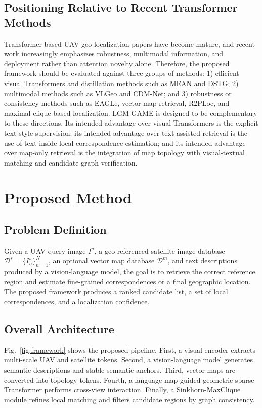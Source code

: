 \documentclass[journal]{IEEEtran}
\begin{document}
\subsection{Positioning Relative to Recent Transformer Methods}
Transformer-based UAV geo-localization papers have become mature, and recent work increasingly emphasizes robustness, multimodal information, and deployment rather than attention novelty alone. Therefore, the proposed framework should be evaluated against three groups of methods: 1) efficient visual Transformers and distillation methods such as MEAN and DSTG; 2) multimodal methods such as VLGeo and CDM-Net; and 3) robustness or consistency methods such as EAGLe, vector-map retrieval, R2PLoc, and maximal-clique-based localization. LGM-GAME is designed to be complementary to these directions. Its intended advantage over visual Transformers is the explicit text-style supervision; its intended advantage over text-assisted retrieval is the use of text inside local correspondence estimation; and its intended advantage over map-only retrieval is the integration of map topology with visual-textual matching and candidate graph verification.

\section{Proposed Method}

\subsection{Problem Definition}
Given a UAV query image $I^u$, a geo-referenced satellite image database $\mathcal{D}^s=\{I^s_n\}_{n=1}^{N}$, an optional vector map database $\mathcal{D}^m$, and text descriptions produced by a vision-language model, the goal is to retrieve the correct reference region and estimate fine-grained correspondences or a final geographic location. The proposed framework produces a ranked candidate list, a set of local correspondences, and a localization confidence.

\subsection{Overall Architecture}
Fig.~\ref{fig:framework} shows the proposed pipeline. First, a visual encoder extracts multi-scale UAV and satellite tokens. Second, a vision-language model generates semantic descriptions and stable semantic anchors. Third, vector maps are converted into topology tokens. Fourth, a language-map-guided geometric sparse Transformer performs cross-view interaction. Finally, a Sinkhorn-MaxClique module refines local matching and filters candidate regions by graph consistency.
\end{document}
